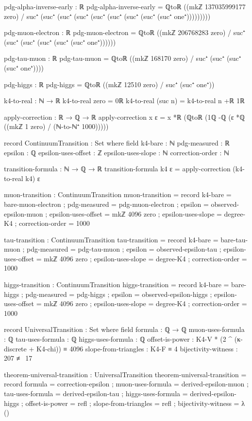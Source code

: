 \documentclass[11pt,a4paper]{book}
\begin{document}
\begin{code}
pdg-alpha-inverse-early : ℝ
pdg-alpha-inverse-early = ℚtoℝ ((mkℤ 137035999177 zero) / suc⁺ (suc⁺ (suc⁺ (suc⁺ (suc⁺ (suc⁺ (suc⁺ (suc⁺ (suc⁺ one⁺)))))))))

pdg-muon-electron : ℝ
pdg-muon-electron = ℚtoℝ ((mkℤ 206768283 zero) / suc⁺ (suc⁺ (suc⁺ (suc⁺ (suc⁺ (suc⁺ one⁺))))))

pdg-tau-muon : ℝ
pdg-tau-muon = ℚtoℝ ((mkℤ 168170 zero) / suc⁺ (suc⁺ (suc⁺ (suc⁺ one⁺))))

pdg-higgs : ℝ
pdg-higgs = ℚtoℝ ((mkℤ 12510 zero) / suc⁺ (suc⁺ one⁺))
\end{code}

\begin{code}
k4-to-real : ℕ → ℝ
k4-to-real zero = 0ℝ
k4-to-real (suc n) = k4-to-real n +ℝ 1ℝ

apply-correction : ℝ → ℚ → ℝ
apply-correction x ε = x *ℝ (ℚtoℝ (1ℚ -ℚ (ε *ℚ ((mkℤ 1 zero) / (ℕ-to-ℕ⁺ 1000)))))

record ContinuumTransition : Set where
  field
    k4-bare : ℕ
    pdg-measured : ℝ
    epsilon : ℚ
    epsilon-uses-offset : ℤ
    epsilon-uses-slope : ℕ
    correction-order : ℕ

transition-formula : ℕ → ℚ → ℝ
transition-formula k4 ε = apply-correction (k4-to-real k4) ε
\end{code}

\begin{code}
muon-transition : ContinuumTransition
muon-transition = record
  { k4-bare = bare-muon-electron
  ; pdg-measured = pdg-muon-electron
  ; epsilon = observed-epsilon-muon
  ; epsilon-uses-offset = mkℤ 4096 zero
  ; epsilon-uses-slope = degree-K4
  ; correction-order = 1000
  }

tau-transition : ContinuumTransition
tau-transition = record
  { k4-bare = bare-tau-muon
  ; pdg-measured = pdg-tau-muon
  ; epsilon = observed-epsilon-tau
  ; epsilon-uses-offset = mkℤ 4096 zero
  ; epsilon-uses-slope = degree-K4
  ; correction-order = 1000
  }

higgs-transition : ContinuumTransition
higgs-transition = record
  { k4-bare = bare-higgs
  ; pdg-measured = pdg-higgs
  ; epsilon = observed-epsilon-higgs
  ; epsilon-uses-offset = mkℤ 4096 zero
  ; epsilon-uses-slope = degree-K4
  ; correction-order = 1000
  }
\end{code}

\begin{code}
record UniversalTransition : Set where
  field
    formula : ℚ → ℚ
    muon-uses-formula : ℚ
    tau-uses-formula : ℚ
    higgs-uses-formula : ℚ
    offset-is-power : K4-V * (2 ^ (κ-discrete + K4-chi)) ≡ 4096
    slope-from-triangles : K4-F ≡ 4
    bijectivity-witness : 207 ≢ 17

theorem-universal-transition : UniversalTransition
theorem-universal-transition = record
  { formula = correction-epsilon
  ; muon-uses-formula = derived-epsilon-muon
  ; tau-uses-formula = derived-epsilon-tau
  ; higgs-uses-formula = derived-epsilon-higgs
  ; offset-is-power = refl
  ; slope-from-triangles = refl
  ; bijectivity-witness = λ ()
  }
\end{code}
\end{document}
